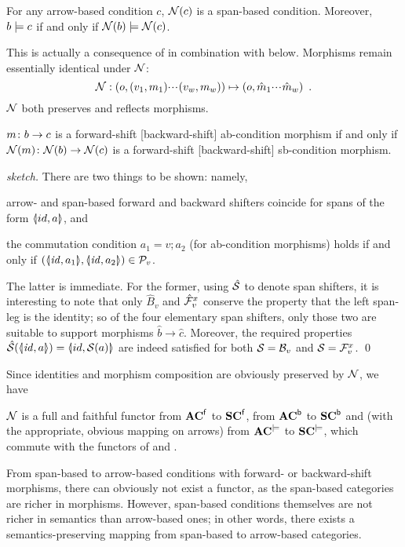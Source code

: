 \begin{proposition}
For any arrow-based condition $c$, $\mathcal{N}(c)$ is a span-based condition. Moreover, $b\models c$ if and only if $\mathcal{N}(b)\models \mathcal{N}(c)$.
\end{proposition}
%
This is actually a consequence of  in combination with  below. Morphisms remain essentially identical under $\mathcal{N}$:
\[ \mathcal{N}: (o,(v_1,m_1){\cdotp\mkern-2mu\cdotp\mkern-2mu\cdotp\mkern1mu} (v_w,m_w)) \mapsto (o,\hat m_1{\cdotp\mkern-2mu\cdotp\mkern-2mu\cdotp\mkern1mu} \hat m_w) \enspace. \]
$\mathcal{N}$ both preserves and reflects morphisms.
%
\begin{proposition}
$m\colon b\rightarrow c$ is a forward-shift [backward-shift] ab-condition morphism if and only if $\mathcal{N}(m)\colon \mathcal{N}(b)\rightarrow \mathcal{N}(c)$ is a forward-shift [backward-shift] sb-condition morphism.
\end{proposition}
%
\begin{proof}[sketch]
There are two things to be shown: namely,
\begin{enumerate*}[label=\emph{(\roman*)}]
\item arrow- and span-based forward and backward shifters coincide for spans of the form $\spanof{id}{a}$, and
\item the commutation condition $a_1=v;a_2$ (for ab-condition morphisms) holds if and only if $(\spanof{\id}{a_1},\spanof{\id}{a_2})\in \cP_v$.
\end{enumerate*}
The latter is immediate. For the former, using $\hat {\mathcal{S}}$ to denote span shifters, it is interesting to note that only $\hat B_v$ and $\hat{\mathcal{F}}_v^x$ conserve the property that the left span-leg is the identity; so of the four elementary span shifters, only those two are suitable to support morphisms $\hat b\to \hat c$. Moreover, the required properties $\hat\cS(\spanof{\id}{a})=\spanof{id}{\cS(a)}$ are indeed satisfied for both $\mathcal{S}=\mathcal{B}_v$ and $\mathcal{S}=\mathcal{F}_v^x$.
\qed
\end{proof}
%
Since identities and morphism composition are obviously preserved by $\mathcal{N}$, we have

\begin{theorem}
$\mathcal{N}$ is a full and faithful functor from $\mathbf{AC}^{\mathsf{f}}$ to $\mathbf{SC}^{\mathsf{f}}$, from $\mathbf{AC}^{\mathsf{b}}$ to $\mathbf{SC}^{\mathsf{b}}$ and (with the appropriate, obvious mapping on arrows) from $\mathbf{AC}^{\models}$ to $\mathbf{SC}^{\models}$, which commute with the functors of  and .
\end{theorem}
%
From span-based to arrow-based conditions with forward- or backward-shift morphisms, there can obviously not exist a functor, as the span-based categories are richer in morphisms. However, span-based conditions themselves are not richer in semantics than arrow-based ones; in other words, there exists a semantics-preserving mapping from span-based to arrow-based categories.

